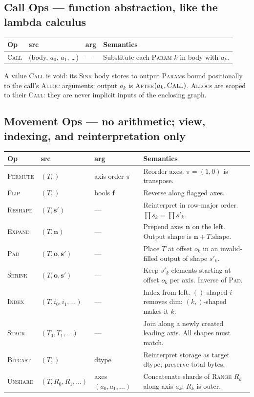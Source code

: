 \documentclass[10pt,letterpaper]{article}
\newcommand{\op}[1]{\textsc{#1}}
\begin{document}
\subsection*{{\color{callblue}Call Ops} \normalfont\small--- function abstraction, like the lambda calculus}

\begin{tabular}{@{}l l l l@{}}
\toprule
\textbf{Op} & \textbf{src} & \textbf{arg} & \textbf{Semantics} \\
\midrule
\op{Call} & (body, $a_0$, $a_1$, \ldots) & --- & Substitute each \op{Param} $k$ in body with $a_k$. \\
\bottomrule
\end{tabular}

\smallskip
A value \op{Call} is void: its \op{Sink} body stores to output \op{Param}s bound positionally to the call's \op{Alloc} arguments; output $a_k$ is \op{After}$(a_k, \op{Call})$. \op{Alloc}s are scoped to their \op{Call}: they are never implicit inputs of the enclosing graph.

\subsection*{{\color{movgreen}Movement Ops} \normalfont\small--- no arithmetic; view, indexing, and reinterpretation only}

\begin{tabular}{@{}l l l l@{}}
\toprule
\textbf{Op} & \textbf{src} & \textbf{arg} & \textbf{Semantics} \\
\midrule
\op{Permute} & $(T,)$ & axis order $\pi$ & Reorder axes. $\pi = (1,0)$ is transpose. \\
\op{Flip} & $(T,)$ & bools $\mathbf{f}$ & Reverse along flagged axes. \\
\op{Reshape} & $(T, \mathbf{s'})$ & --- & Reinterpret in row-major order. $\prod s_k = \prod s'_k$. \\
\op{Expand} & $(T, \mathbf{n})$ & --- & Prepend axes $\mathbf{n}$ on the left. Output shape is $\mathbf{n} + T.\mathrm{shape}$. \\
\op{Pad} & $(T, \mathbf{o}, \mathbf{s'})$ & --- & Place $T$ at offset $o_k$ in an invalid-filled output of shape $s'_k$. \\
\op{Shrink} & $(T, \mathbf{o}, \mathbf{s'})$ & --- & Keep $s'_k$ elements starting at offset $o_k$ per axis. Inverse of \op{Pad}. \\
\op{Index} & $(T, i_0, i_1, \ldots)$ & --- & Index from left. $()$-shaped $i$ removes dim; $(k,)$-shaped makes it $k$. \\
\op{Stack} & $(T_0, T_1, \ldots)$ & --- & Join along a newly created leading axis. All shapes must match. \\
\op{Bitcast} & $(T,)$ & dtype & Reinterpret storage as target dtype; preserve total bytes. \\
\op{Unshard} & $(T, R_0, R_1, \ldots)$ & axes $(a_0, a_1, \ldots)$ & Concatenate shards of \op{Range} $R_k$ along axis $a_k$; $R_k$ is outer. \\
\bottomrule
\end{tabular}
\end{document}
